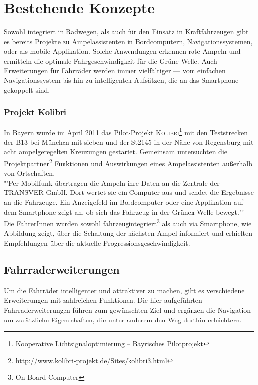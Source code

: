 \chapter{\label{chap:state}Bestehende Konzepte}
Sowohl integriert in Radwegen, als auch für den Einsatz in Kraftfahrzeugen gibt es bereits Projekte zu Ampelassistenten in Bordcomputern, Navigationssystemen, oder als mobile Applikation. Solche Anwendungen erkennen rote Ampeln und ermitteln die optimale Fahrgeschwindigkeit für die Grüne Welle. Auch Erweiterungen für Fahrräder werden immer vielfältiger --- vom einfachen Navigationssystem bis hin zu intelligenten Aufsätzen, die an das \gls{Smartphone} gekoppelt sind.


\subsection*{\label{sec:kolibri}Projekt Kolibri}
In Bayern wurde im April 2011 das Pilot-Projekt \textsc{Kolibri}\footnote{ Kooperative Lichtsignaloptimierung -- Bayrisches Pilotprojekt} mit den Teststrecken der B13 bei München mit sieben und der St2145 in der Nähe von Regensburg mit acht ampelgeregelten Kreuzungen gestartet. Gemeinsam untersuchten die Projektpartner\footnote{ \url{http://www.kolibri-projekt.de/Sites/kolibri3.html}} Funktionen und Auswirkungen eines Ampelassistenten außerhalb von Ortschaften. \cite{cobi}\\
"'Per Mobilfunk übertragen die Ampeln ihre Daten an die Zentrale der TRANSVER GmbH. Dort wertet sie ein Computer aus und sendet die Ergebnisse an die Fahrzeuge. Ein Anzeigefeld im Bordcomputer oder eine Applikation auf dem \gls{Smartphone} zeigt an, ob sich das Fahrzeug in der Grünen Welle bewegt."'\\
Die FahrerInnen wurden sowohl fahrzeugintegriert\footnote{ On-Board-Computer} als auch via \gls{Smartphone}, wie Abbildung zeigt, über die Schaltung der nächsten Ampel informiert und erhielten Empfehlungen über die aktuelle \gls{Progressionsgeschwindigkeit}.

%
%
\clearpage
\section{Fahrraderweiterungen}
Um die Fahrräder intelligenter und attraktiver zu machen, gibt es verschiedene Erweiterungen mit zahlreichen Funktionen. Die hier aufgeführten Fahrraderweiterungen führen zum gewünschten Ziel und ergänzen die Navigation um zusätzliche Eigenschaften, die unter anderem den Weg dorthin erleichtern.
